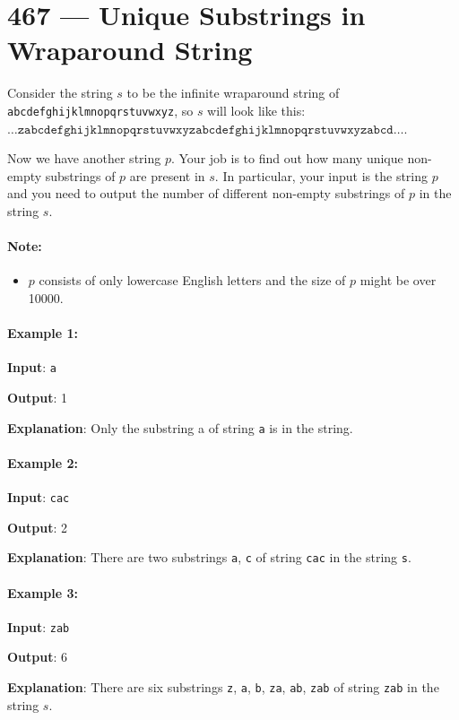 \section{467 --- Unique Substrings in Wraparound String}
Consider the string $s$ to be the infinite wraparound string of \texttt{abcdefghijklmnopqrstuvwxyz}, so $s$ will look like this:  $\ldots \texttt{zabcdefghijklmnopqrstuvwxyzabcdefghijklmnopqrstuvwxyzabcd} \ldots$.

Now we have another string $p$. Your job is to find out how many unique non-empty substrings of $p$ are present in $s$. In particular, your input is the string $p$ and you need to output the number of different non-empty substrings of $p$ in the string $s$.

\paragraph{Note:} 
\begin{itemize}
\item $p$ consists of only lowercase English letters and the size of $p$ might be over 10000.
\end{itemize}

\paragraph{Example 1:}
\begin{flushleft}
\textbf{Input}: \texttt{a}

\textbf{Output}: 1

\textbf{Explanation}: Only the substring a of string \texttt{a} is in the string.

\end{flushleft}


\paragraph{Example 2:}
\begin{flushleft}

\textbf{Input}: \texttt{cac}

\textbf{Output}: 2

\textbf{Explanation}: There are two substrings \texttt{a}, \texttt{c} of string \texttt{cac} in the string \texttt{s}.


\end{flushleft}

\paragraph{Example 3:}
\begin{flushleft}
\textbf{Input}: \texttt{zab}

\textbf{Output}: 6

\textbf{Explanation}: There are six substrings \texttt{z}, \texttt{a}, \texttt{b}, \texttt{za}, \texttt{ab}, \texttt{zab} of string \texttt{zab} in the string $s$.
\end{flushleft}

